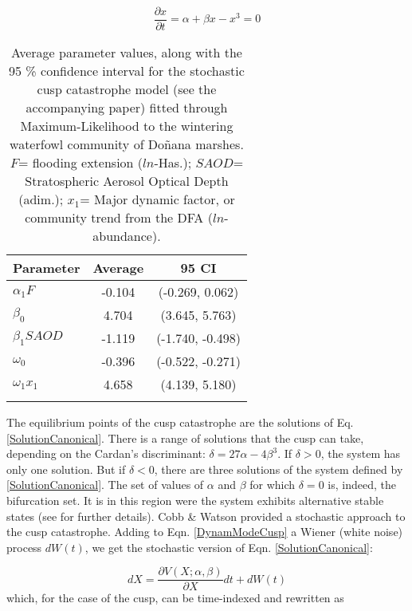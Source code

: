 \documentclass[11pt]{article}
\begin{document}
{\begin{equation}\label{SolutionCanonical}
	\frac{\partial x}{\partial t} = \alpha + \beta x - x^3 = 0
\end{equation}

\begin{table}
	\centering
	\caption[Average parameter values for the cusp catastrophe model]{Average parameter values, along with the 95 \% confidence interval for the stochastic cusp catastrophe model (see the accompanying paper) fitted through Maximum-Likelihood to the wintering waterfowl community of Doñana marshes. $F$= flooding extension ($ln$-Has.); $SAOD$= Stratospheric Aerosol Optical Depth (adim.); $x_{1}$= Major dynamic factor, or community trend from the DFA ($ln$-abundance).}
	\label{tab:TableCusp}
	\begin{tabular}{lcc}%
		\toprule
		\textbf{Parameter} & \textbf{Average} & \textbf{95 CI} \\
		\midrule
		$ \alpha_{1}F $ & -0.104 & (-0.269, 0.062) \\
		$ \beta_{0} $ & 4.704 & (3.645, 5.763) \\
		$ \beta_{1}SAOD $ & -1.119 & (-1.740, -0.498) \\
		$ \omega_{0} $ & -0.396 & (-0.522, -0.271) \\
		$ \omega_{1}x_{1} $ & 4.658 & (4.139, 5.180) \\
		\bottomrule
		&& \\
	\end{tabular}
\end{table}

The equilibrium points of the cusp catastrophe are the solutions of Eq. \ref{SolutionCanonical}. There is a range of solutions that the cusp can take, depending on the Cardan's discriminant: $ \delta = 27\alpha - 4\beta^3 $. If $ \delta > 0 $, the system has only one solution. But if $ \delta < 0 $, there are three solutions of the system defined by \ref{SolutionCanonical}. The set of values of $ \alpha $ and $ \beta $ for which $ \delta = 0 $ is, indeed, the bifurcation set. It is in this region were the system exhibits alternative stable states (see \cite{Thom1975,Poston1979,Casti1979,Grasman2009} for further details). Cobb \& Watson \cite{Cobb1980} provided a stochastic approach to the cusp catastrophe. Adding to Eqn. \ref{DynamModeCusp} a Wiener (white noise) process $ dW(t) $, we get the stochastic version of Eqn. \ref{SolutionCanonical}:

\begin{equation}\label{StochCuspModel_1}
	dX = \dfrac{\partial V(X; \alpha,\beta)}{\partial X}dt + dW(t)
\end{equation}
which, for the case of the cusp, can be time-indexed and rewritten as

}
\end{document}
